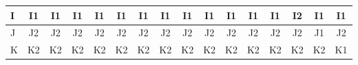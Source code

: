 \documentclass[twoside]{article}
\newenvironment{answer}{}{\medskip}
\begin{document}
\begin{answer}
\begin{table}[h]
\begin{latin}
\begin{tabular}{l|c|c|c|c|c|c|c|c|c|c|c|c|c|c|c|}
\multicolumn{1}{|l|}{I} & I1                                 & I1                                & I1                                & I1                                & I1                                & I1                                & I1                                & I1                                & I1                                & I1                                & I1                                 & I1                                 & I2                                 & I1                                 & I1                                 \\ \hline
\multicolumn{1}{|l|}{J} & J2                                 & J2                                & J2                                & J2                                & J2                                & J2                                & J2                                & J2                                & J2                                & J2                                & J2                                 & J2                                 & J2                                 & J1                                 & J2                                 \\ \hline
\multicolumn{1}{|l|}{K} & K2                                 & K2                                & K2                                & K2                                & K2                                & K2                                & K2                                & K2                                & K2                                & K2                                & K2                                 & K2                                 & K2                                 & K2                                 & K1                                 \\ \hline
	\end{tabular}
	\end{latin}
	\end{table}
\end{answer}
\end{document}
